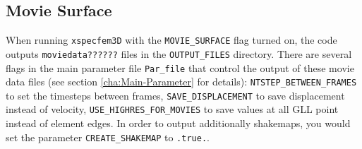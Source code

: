 \subsection{Movie Surface}

When running \texttt{xspecfem3D} with the \texttt{MOVIE\_SURFACE}
flag turned on, the code outputs \texttt{moviedata??????} files in
the \texttt{OUTPUT\_FILES} directory. There are several flags in the
main parameter file \texttt{Par\_file} that control the output of
these movie data files (see section \ref{cha:Main-Parameter} for
details): \texttt{\small NTSTEP\_BETWEEN\_FRAMES}{\small{} to set the
timesteps between frames, }\texttt{\small SAVE\_DISPLACEMENT}{\small{}
to save displacement instead of velocity, }\texttt{\small USE\_HIGHRES\_FOR\_MOVIES}{\small{}
to save values at all GLL point instead of element edges. In order
to output additionally shakemaps, you would set the parameter }\texttt{\small CREATE\_SHAKEMAP}{\small{}
to }\texttt{\small .true.}{\small .}{\small \par}

